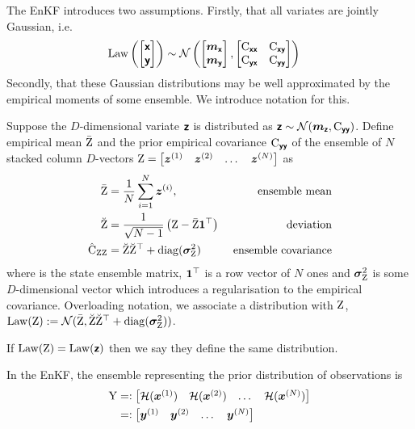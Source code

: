 \documentclass{article}
\begin{document}
{{The EnKF introduces two assumptions.
Firstly, that all variates are jointly Gaussian, i.e.
\begin{align}
    \operatorname{Law} \left( \begin{bmatrix}
        \boldsymbol{\mathsf{x}}\\
        \boldsymbol{\mathsf{y}}
    \end{bmatrix}\right) &\sim \mathcal{N}\left(\begin{bmatrix} \boldsymbol{m}_{\boldsymbol{\mathsf{x}}} \\ \boldsymbol{m}_{\boldsymbol{\mathsf{y}}} \end{bmatrix}, \begin{bmatrix} \mathrm{C}_{\boldsymbol{\mathsf{xx}}} & \mathrm{C}_{\boldsymbol{\mathsf{xy}}} \\ \mathrm{C}_{\boldsymbol{\mathsf{yx}}} & \mathrm{C}_{\boldsymbol{\mathsf{yy}}} \end{bmatrix}\right)
\end{align}
Secondly, that these Gaussian distributions may be well approximated by the empirical moments of some ensemble.
We introduce notation for this.

Suppose the $D$-dimensional variate $\boldsymbol{\mathsf{z}}$ is distributed as
$\boldsymbol{\mathsf{z}}\sim\mathcal{N}(\boldsymbol{m}_{\boldsymbol{\mathsf{z}}},\mathrm{C}_{\boldsymbol{\mathsf{yy}}})$.
Define empirical mean $\bar{\mathrm{Z}}$ and the prior empirical covariance $\mathrm{C}_{\boldsymbol{\mathsf{yy}}}$ of the ensemble of $N$ stacked column $D$-vectors  $\mathrm{Z} = \begin{bmatrix}\boldsymbol{z}^{(1)}& \boldsymbol{z}^{(2)}& \dots& \boldsymbol{z}^{(N)}\end{bmatrix}$ as
\begin{align}
    \bar{\mathrm{Z}} &= \frac{1}{N} \sum_{i=1}^N \boldsymbol{z}^{(i)}, \label{eq:ensemble_mean} & \text{ ensemble mean} \\
    \breve{\mathrm{Z}} &= \frac{1}{\sqrt{N-1}} \left( \mathrm{Z} - \bar{\mathrm{Z}} \boldsymbol{1}^\top \right) &\text{ deviation}  \label{eq:deviation_matrix} \\
    \hat{\mathrm{C}}_{\mathrm{ZZ}} &= \breve{\mathrm{Z}} \breve{\mathrm{Z}}^\top + \operatorname{diag}(\boldsymbol{\sigma}_{\mathrm{Z}}^2)&\text{ ensemble covariance}  \label{eq:ensemble-covariance}
\end{align}
where is the state ensemble matrix, $\boldsymbol{1}^\top$ is a row vector of $N$ ones and $\boldsymbol{\sigma}_{\mathrm{Z}}^2$ is some $D$-dimensional vector which introduces a regularisation to the empirical covariance.
Overloading notation, we associate a distribution with $\mathrm{Z}$,
$\operatorname{Law}(\mathrm{Z}) := \mathcal{N}(\bar{\mathrm{Z}}, \breve{\mathrm{Z}} \breve{\mathrm{Z}}^\top + \operatorname{diag}(\boldsymbol{\sigma}_{\mathrm{Z}}^2))$.

If $\operatorname{Law}(\mathrm{Z})=\operatorname{Law}(\boldsymbol{\mathsf{z}})$ then we say they define the same distribution.

In the EnKF, the ensemble representing the prior distribution of observations is
\begin{align}
    \mathrm{Y} &=: \begin{bmatrix}\mathcal{H}(\boldsymbol{x}^{(1)}) & \mathcal{H}(\boldsymbol{x}^{(2)})& \dots& \mathcal{H}(\boldsymbol{x}^{(N)})\end{bmatrix}\\
    &=: \begin{bmatrix}\boldsymbol{y}^{(1)}& \boldsymbol{y}^{(2)}& \dots& \boldsymbol{y}^{(N)}\end{bmatrix}
\end{align}


}}
\end{document}
